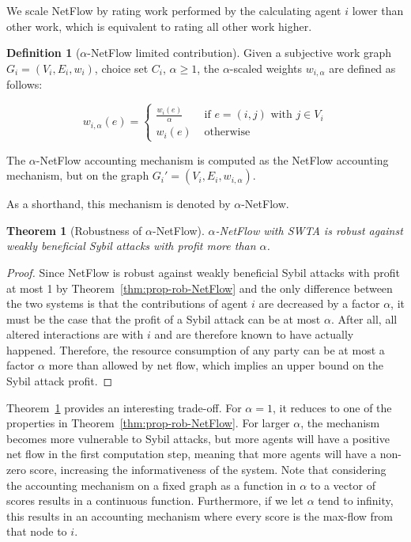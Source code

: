 \documentclass[a4paper,11pt]{book}
\newtheorem{theorem}{Theorem}
\theoremstyle{definition}
\newtheorem{definition}{Definition}
\begin{document}
We scale NetFlow by rating work performed by the calculating agent $i$ lower than other
work, which is equivalent to rating all other work higher.

\begin{definition}[$\alpha$-NetFlow limited contribution]
    Given a subjective work graph $G_i = (V_i, E_i, w_i)$, choice set $C_i$, $\alpha \geq 1$, the $\alpha$-scaled
    weights $w_{i,\alpha}$ are defined as follows:

    \begin{equation*}
        w_{i,\alpha}(e) = 
        \begin{cases}
            \frac{w_i(e)}{\alpha} &\mbox{ if } e = (i, j) \mbox{ with } j \in V_i \\
            w_i(e) &\mbox{ otherwise}
        \end{cases}
    \end{equation*}
    
    The $\alpha$-NetFlow accounting mechanism is computed as the NetFlow accounting
    mechanism, but on the graph $G_i' = (V_i, E_i, w_{i,\alpha})$.

    As a shorthand, this mechanism is denoted by $\alpha$-NetFlow.
\end{definition}

\begin{theorem}[Robustness of $\alpha$-NetFlow]
    $\alpha$-NetFlow with SWTA is robust against weakly beneficial Sybil attacks with
    profit more than $\alpha$.
    \label{thm:Sybil-anf}
\end{theorem}

\begin{proof}
    Since NetFlow is robust against weakly beneficial Sybil attacks with profit at most
    1 by Theorem~\ref{thm:prop-rob-NetFlow}  and the only difference between the two systems is that the contributions of
    agent $i$ are decreased by a factor $\alpha$, it must be the case that the profit
    of a Sybil attack can be at most $\alpha$. After all, all altered interactions
    are with $i$ and are therefore known to have actually happened. Therefore, the
    resource consumption of any party can be at most a factor $\alpha$ more than allowed
    by net flow, which implies an upper bound on the Sybil attack profit.
\end{proof}

Theorem~\ref{thm:Sybil-anf} provides an interesting trade-off. For $\alpha=1$, it reduces
to one of the properties in Theorem~\ref{thm:prop-rob-NetFlow}. For larger $\alpha$,
the mechanism becomes more vulnerable to Sybil attacks, but more agents will have
a positive net flow in the first computation step, meaning that more agents will
have a non-zero score, increasing the informativeness of the system. Note
that considering the accounting mechanism on a fixed graph as a function in $\alpha$ to
a vector of scores results in a continuous function. Furthermore, if we let $\alpha$
tend to infinity, this results in an accounting mechanism where every score is the
max-flow from that node to $i$. 
\end{document}
